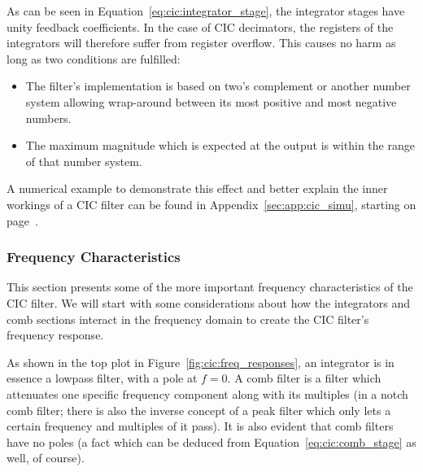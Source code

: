 As  can  be  seen in  Equation~\ref{eq:cic:integrator_stage},  the  integrator
stages have  unity feedback coefficients. In  the case of CIC  decimators, the
registers of  the integrators  will therefore  suffer from  register overflow.
This causes no harm as long as two conditions are fulfilled:
\begin{itemize}\tightlist
    \item
        The filter's  implementation is based  on two's complement  or another
        number system allowing wrap-around between  its most positive and most
        negative numbers.
    \item
        The maximum  magnitude which is expected  at the output is  within the
        range of that number system.
\end{itemize}

A numerical  example to demonstrate this  effect and better explain  the inner
workings  of a  CIC filter  can be  found in  Appendix~\ref{sec:app:cic_simu},
starting on page~\pageref{sec:app:cic_simu}.

%
%
\subsubsection{Frequency Characteristics} %
\label{subsubsec:cic:frequency_characteristics}

This section presents some of  the more important frequency characteristics of
the  CIC  filter. We  will  start  with  some  considerations  about  how  the
integrators and comb  sections interact in the frequency domain  to create the
CIC filter's frequency response.

As shown in the top plot in Figure~\ref{fig:cic:freq_responses}, an integrator
is in essence  a lowpass filter, with a pole  at $f = 0$.  A comb  filter is a
filter  which  attenuates one  specific  frequency  component along  with  its
multiples (in a notch comb filter; there is also the inverse concept of a peak
filter which only lets  a certain frequency and multiples of  it pass).  It is
also evident that comb filters have no poles (a fact which can be deduced from
Equation~\ref{eq:cic:comb_stage} as well, of course).

